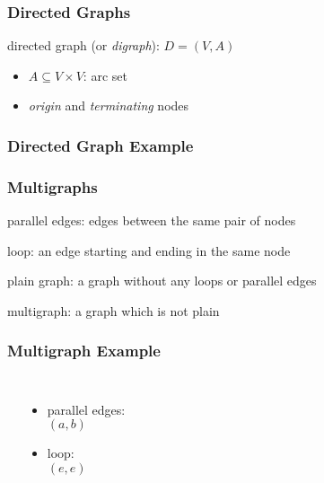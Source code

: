 \documentclass[dvipsnames]{beamer}
\begin{document}
\begin{frame}
  \frametitle{Directed Graphs}

  \begin{definition}
    \alert{directed graph} (or \emph{digraph}): $D=(V,A)$

    \begin{itemize}
      \item $A \subseteq V \times V$: \alert{arc} set
      \item \emph{origin} and \emph{terminating} nodes
    \end{itemize}
  \end{definition}
\end{frame}

\begin{frame}
  \frametitle{Directed Graph Example}

  \begin{example}
    \begin{center}
    \end{center}
  \end{example}
\end{frame}

\begin{frame}
  \frametitle{Multigraphs}

  \begin{definition}
    \alert{parallel edges}: edges between the same pair of nodes

    \bigskip
    \alert{loop}: an edge starting and ending in the same node

    \pause
    \bigskip
    \alert{plain graph}: a graph without any loops or parallel edges

    \bigskip
    \alert{multigraph}: a graph which is not plain
  \end{definition}
\end{frame}

\begin{frame}
  \frametitle{Multigraph Example}

  \begin{example}
    \begin{columns}
      \begin{center}
      \end{center}

      \begin{itemize}
        \item parallel edges:\\
          $(a,b)$
        \item loop:\\
          $(e,e)$
      \end{itemize}
    \end{columns}
  \end{example}
\end{frame}
\end{document}
